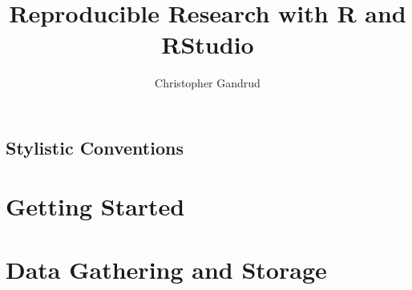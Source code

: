 \documentclass[krantz1]{krantz}
\newcommand{\blankpage}{
	\newpage
	\thispagestyle{empty}
	\mbox{}
	\newpage
}
\begin{document}
\title{Reproducible Research with R and RStudio}

\author{Christopher Gandrud}

\maketitle


\frontmatter

\blankpage
\blankpage
\blankpage
\blankpage





\tableofcontents

\chapter*{Stylistic Conventions}\label{StylisticConventions}










\listoffigures
\listoftables


\mainmatter

\setcounter{page}{1}

\part{Getting Started}











\part{Data Gathering and Storage}
\end{document}
